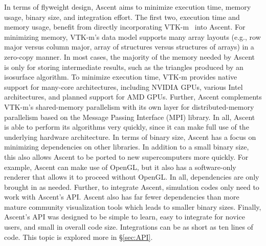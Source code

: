 In terms of flyweight design, Ascent aims to minimize
execution time, memory usage, binary size, and integration effort.
%
The first two, execution time and memory usage, benefit from directly
incorporating VTK-m~\cite{Moreland:CGA2016} into Ascent.
%
For minimizing memory,
VTK-m's data model supports many array layouts (e.g., row major versus
column major, array of structures versus structures of arrays)
in a zero-copy manner.
%
In most cases, the majority of the memory needed by Ascent is only for
storing intermediate results, such as the triangles produced by an isosurface algorithm.
%
To minimize execution time,
VTK-m provides native support for many-core architectures,
including NVIDIA GPUs, various Intel architectures,
and planned support for AMD GPUs.
%
Further, Ascent complements VTK-m's shared-memory parallelism with
its own layer for distributed-memory parallelism based on the
Message Passing Interface (MPI) library.
%
In all, Ascent is able to perform its algorithms very quickly,
since it can make full use of the underlying hardware architecture.
%
In terms of binary size, Ascent has a focus on minimizing dependencies on other libraries.
%
In addition to a small binary size, this also allows Ascent to be ported to new supercomputers
more quickly.
%
For example, Ascent can make use of OpenGL, but it also has a software-only renderer that allows
it to proceed without OpenGL.
%
In all, dependencies are only brought in as needed.
%
Further, to integrate Ascent, simulation codes only need to work with Ascent's API.
%
Ascent also has far fewer dependencies than more mature community
visualization tools which leads to smaller binary sizes.
%
%
Finally, Ascent's API was designed to be simple to learn,
easy to integrate for novice users, and small in overall code size.
%
Integrations can be as short as ten lines of code.
%
This topic is explored more in \S\ref{sec:API}.

